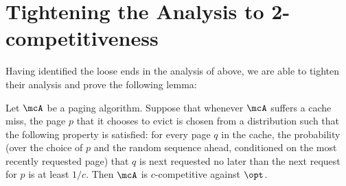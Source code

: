 \documentclass[11pt]{article}
\begin{document}
 \section{Tightening the Analysis to 2-competitiveness}
\label{sec:tight-analysis}
Having identified the loose ends in the analysis of \cite{lund1999paging} above, we are able to tighten their analysis and prove the following lemma:
\begin{lemma}
    \label{lem:tight-analysis}
    Let $\mcA$ be a paging algorithm. Suppose that whenever $\mcA$ suffers a cache miss, the page $p$ that it chooses to evict is chosen from a distribution such that the following property is satisfied: for every page $q$ in the cache, the probability (over the choice of $p$ and the random sequence ahead, conditioned on the most recently requested page) that $q$ is next requested no later than the next request for $p$ is at least $1/c$. Then $\mcA$ is $c$-competitive against $\opt$.
\end{lemma}
\end{document}
